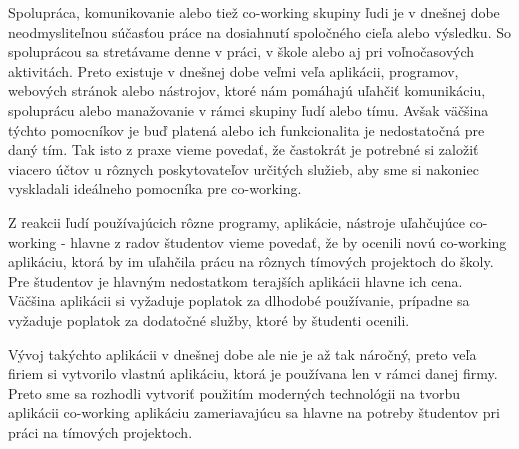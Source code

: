 \indent Spolupráca, komunikovanie alebo tiež co-working skupiny ľudi je v dnešnej dobe neodmysliteľnou súčasťou práce na dosiahnutí spoločného cieľa alebo výsledku. So spoluprácou sa stretávame denne v práci, v škole alebo aj pri voľnočasových aktivitách. Preto existuje v dnešnej dobe veľmi veľa aplikácii, programov, webových stránok alebo nástrojov, ktoré nám pomáhajú uľahčiť komunikáciu, spoluprácu alebo manažovanie v rámci skupiny ľudí alebo tímu. Avšak väčšina týchto pomocníkov je buď platená alebo ich funkcionalita je nedostatočná pre daný tím. Tak isto z praxe vieme povedať, že častokrát je potrebné si založiť viacero účtov u rôznych poskytovateľov určitých služieb, aby sme si nakoniec vyskladali ideálneho pomocníka pre co-working.

\indent Z reakcii ľudí používajúcich rôzne programy, aplikácie, nástroje uľahčujúce co-working - hlavne z radov študentov vieme povedať, že by ocenili novú co-working aplikáciu, ktorá by im uľahčila prácu na rôznych tímových projektoch do školy. Pre študentov je hlavným nedostatkom terajších aplikácii hlavne ich cena. Väčšina aplikácii si vyžaduje poplatok za dlhodobé používanie, prípadne sa vyžaduje poplatok za dodatočné služby, ktoré by študenti ocenili. 

\indent Vývoj takýchto aplikácii v dnešnej dobe ale nie je až tak náročný, preto veľa firiem si vytvorilo vlastnú aplikáciu, ktorá je používana len v rámci danej firmy. Preto sme sa rozhodli vytvoriť použitím moderných technológii na tvorbu aplikácii co-working aplikáciu zameriavajúcu sa hlavne na potreby študentov pri práci na tímových projektoch.  